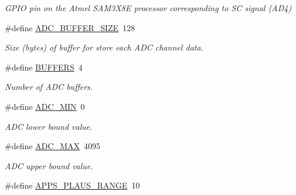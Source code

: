 \begin{DoxyCompactItemize}
\begin{DoxyCompactList}\small\item\em G\-P\-I\-O pin on the Atmel S\-A\-M3\-X8\-E processor corresponding to S\-C signal (A\-D4) \end{DoxyCompactList}\item 
\hypertarget{group___board__model__group_ga602abb8ec84dcb3b6f854a738310ea46}{\#define \hyperlink{group___board__model__group_ga602abb8ec84dcb3b6f854a738310ea46}{A\-D\-C\-\_\-\-B\-U\-F\-F\-E\-R\-\_\-\-S\-I\-Z\-E}~128}\label{group___board__model__group_ga602abb8ec84dcb3b6f854a738310ea46}

\begin{DoxyCompactList}\small\item\em Size (bytes) of buffer for store each A\-D\-C channel data. \end{DoxyCompactList}\item 
\hypertarget{group___board__model__group_gaabe0f927d44a09f458bd5fe5ab4e2f7f}{\#define \hyperlink{group___board__model__group_gaabe0f927d44a09f458bd5fe5ab4e2f7f}{B\-U\-F\-F\-E\-R\-S}~4}\label{group___board__model__group_gaabe0f927d44a09f458bd5fe5ab4e2f7f}

\begin{DoxyCompactList}\small\item\em Number of A\-D\-C buffers. \end{DoxyCompactList}\item 
\hypertarget{group___board__model__group_gaf0098a1eafb8a60a1c65773e1064d595}{\#define \hyperlink{group___board__model__group_gaf0098a1eafb8a60a1c65773e1064d595}{A\-D\-C\-\_\-\-M\-I\-N}~0}\label{group___board__model__group_gaf0098a1eafb8a60a1c65773e1064d595}

\begin{DoxyCompactList}\small\item\em A\-D\-C lower bound value. \end{DoxyCompactList}\item 
\hypertarget{group___board__model__group_ga555a695bf58df062dc03f0e892d95cd7}{\#define \hyperlink{group___board__model__group_ga555a695bf58df062dc03f0e892d95cd7}{A\-D\-C\-\_\-\-M\-A\-X}~4095}\label{group___board__model__group_ga555a695bf58df062dc03f0e892d95cd7}

\begin{DoxyCompactList}\small\item\em A\-D\-C upper bound value. \end{DoxyCompactList}\item 
\hypertarget{group___board__model__group_ga3e1022cd2e2154437b583f7ff83f2960}{\#define \hyperlink{group___board__model__group_ga3e1022cd2e2154437b583f7ff83f2960}{A\-P\-P\-S\-\_\-\-P\-L\-A\-U\-S\-\_\-\-R\-A\-N\-G\-E}~10}\label{group___board__model__group_ga3e1022cd2e2154437b583f7ff83f2960}


\end{DoxyCompactItemize}
